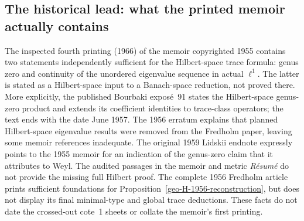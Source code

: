 \subsection{The historical lead: what the printed memoir actually contains}
\begin{proposition}
\label{geo-H-history}
The inspected fourth printing (1966) of the memoir copyrighted 1955
contains two statements independently sufficient for the Hilbert-space
trace formula: genus zero and continuity of the unordered eigenvalue
sequence in actual $\ell^1$. The latter is stated as a Hilbert-space input
to a Banach-space reduction, not proved there. More explicitly,
the published Bourbaki expos\'e~91 states the Hilbert-space genus-zero
product and extends its coefficient identities to trace-class operators;
the text ends with the date June 1957. The 1956
erratum explains that planned Hilbert-space eigenvalue results were removed
from the Fredholm paper, leaving some memoir references inadequate.
The original 1959 Lidskii endnote expressly points to the 1955 memoir
for an indication of the genus-zero claim that it attributes to Weyl.
The audited passages in the memoir and metric \emph{R\'esum\'e} do not
provide the missing full Hilbert proof. The complete 1956 Fredholm article
prints sufficient foundations for Proposition~\ref{geo-H-1956-reconstruction},
but does not display its final minimal-type and global trace deductions.
These facts do not date the crossed-out cote~1 sheets or collate the
memoir's first printing.
\end{proposition}
